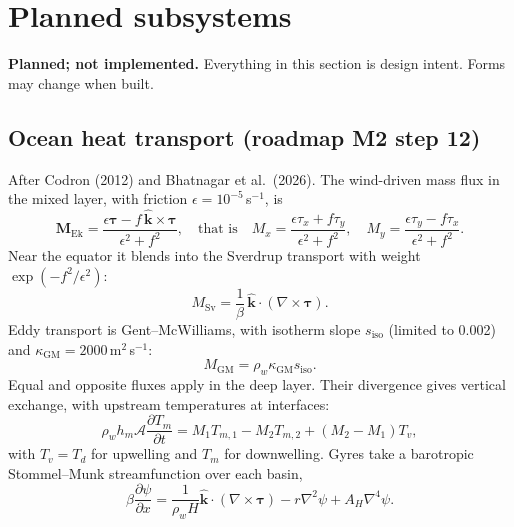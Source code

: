 \documentclass[11pt,a4paper]{article}
\newcommand{\pd}[2]{\frac{\partial #1}{\partial #2}}
\newcommand{\vect}[1]{\bm{#1}}
\newcommand{\kvec}{\hat{\vect{k}}}
\newcommand{\planned}{\textbf{Planned; not implemented.} }
\begin{document}
\section{Planned subsystems}\label{sec:planned}

\planned Everything in this section is design intent. Forms may change when built.

\subsection{Ocean heat transport (roadmap M2 step 12)}
After Codron (2012) and Bhatnagar et al.\ (2026). The wind-driven mass flux in the
mixed layer, with friction $\epsilon = 10^{-5}$\,s$^{-1}$, is
\begin{equation}
\vect{M}_{\mathrm{Ek}} = \frac{\epsilon\vect{\tau} - f\,\kvec\times\vect{\tau}}{\epsilon^2 + f^2},
\quad\text{that is}\quad
M_x = \frac{\epsilon\tau_x + f\tau_y}{\epsilon^2+f^2}, \quad
M_y = \frac{\epsilon\tau_y - f\tau_x}{\epsilon^2+f^2}.
\end{equation}
Near the equator it blends into the Sverdrup transport with weight
$\exp(-f^2/\epsilon^2)$:
\begin{equation}
M_{\mathrm{Sv}} = \frac{1}{\beta}\,\kvec\cdot(\nabla\times\vect{\tau}) .
\end{equation}
Eddy transport is Gent--McWilliams, with isotherm slope $s_{\mathrm{iso}}$ (limited to
0.002) and $\kappa_{\mathrm{GM}} = 2000$\,m$^2$\,s$^{-1}$:
\begin{equation}
M_{\mathrm{GM}} = \rho_w\kappa_{\mathrm{GM}}s_{\mathrm{iso}} .
\end{equation}
Equal and opposite fluxes apply in the deep layer. Their divergence gives vertical
exchange, with upstream temperatures at interfaces:
\begin{equation}
\rho_w h_m \mathcal{A}\pd{T_m}{t} = M_1T_{m,1} - M_2T_{m,2} + (M_2 - M_1)T_v,
\end{equation}
with $T_v = T_d$ for upwelling and $T_m$ for downwelling. Gyres take a barotropic
Stommel--Munk streamfunction over each basin,
\begin{equation}
\beta\pd{\psi}{x} = \frac{1}{\rho_w H}\kvec\cdot(\nabla\times\vect{\tau})
   - r\nabla^2\psi + A_H\nabla^4\psi .
\end{equation}
\end{document}
